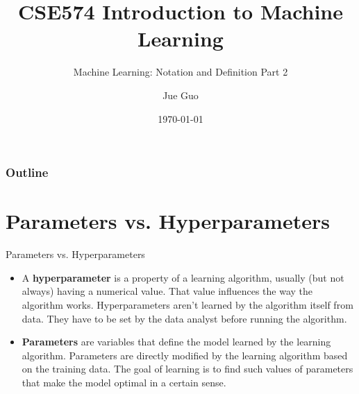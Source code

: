 \documentclass[9pt,dvipsnames]{beamer}
\title{CSE574 Introduction to Machine Learning}
\subtitle{Machine Learning: Notation and Definition Part 2}
\author{Jue Guo}
\institute{University at Buffalo}
\date{\today}
\begin{document}
\begin{frame}
    \titlepage
\end{frame}

\begin{frame}
    \frametitle{Outline}
    \tableofcontents
\end{frame}

\section{Parameters vs. Hyperparameters}
\begin{frame}{Parameters vs. Hyperparameters}
    \begin{itemize}
        \item A \textbf{hyperparameter} is a property of a learning algorithm, usually (but not always) having a numerical value. That value influences the way the algorithm works. Hyperparameters aren't learned by the algorithm itself from data. They have to be set by the data analyst before running the algorithm.
        \item \textbf{Parameters} are variables that define the model learned by the learning algorithm. Parameters are directly modified by the learning algorithm based on the training data. The goal of learning is to find such values of parameters that make the model optimal in a certain sense.
    \end{itemize}
\end{frame}
\end{document}
